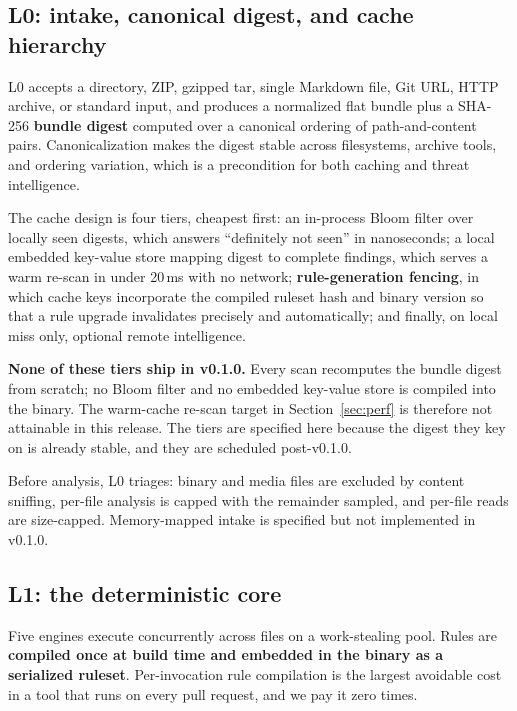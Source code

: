 \documentclass[11pt]{article}
\begin{document}
\subsection{L0: intake, canonical digest, and cache hierarchy}
\label{sec:l0}

L0 accepts a directory, ZIP, gzipped tar, single Markdown file, Git URL, HTTP
archive, or standard input, and produces a normalized flat bundle plus a
SHA-256 \textbf{bundle digest} computed over a canonical ordering of
path-and-content pairs. Canonicalization makes the digest stable across
filesystems, archive tools, and ordering variation, which is a precondition for
both caching and threat intelligence.

The cache design is four tiers, cheapest first: an in-process Bloom filter over
locally seen digests, which answers ``definitely not seen'' in nanoseconds; a
local embedded key-value store mapping digest to complete findings, which
serves a warm re-scan in under 20\,ms with no network; \textbf{rule-generation
fencing}, in which cache keys incorporate the compiled ruleset hash and binary
version so that a rule upgrade invalidates precisely and automatically; and
finally, on local miss only, optional remote intelligence.

\textbf{None of these tiers ship in v0.1.0.} Every scan recomputes the bundle
digest from scratch; no Bloom filter and no embedded key-value store is
compiled into the binary. The warm-cache re-scan target in
Section~\ref{sec:perf} is therefore not attainable in this release. The tiers
are specified here because the digest they key on is already stable, and they
are scheduled post-v0.1.0.

Before analysis, L0 triages: binary and media files are excluded by content
sniffing, per-file analysis is capped with the remainder sampled, and per-file
reads are size-capped. Memory-mapped intake is specified but not implemented in
v0.1.0.

\subsection{L1: the deterministic core}
\label{sec:l1}

Five engines execute concurrently across files on a work-stealing pool. Rules
are \textbf{compiled once at build time and embedded in the binary as a
serialized ruleset}. Per-invocation rule compilation is the largest avoidable
cost in a tool that runs on every pull request, and we pay it zero times.
\end{document}
